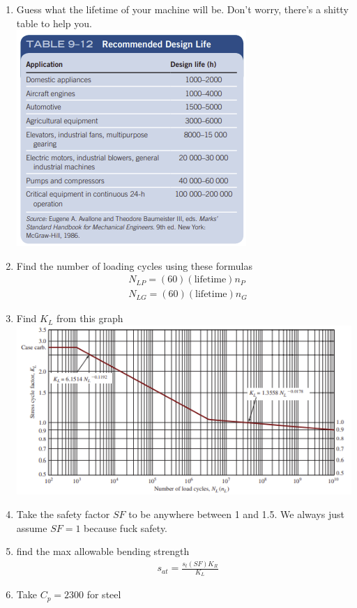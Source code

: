 \documentclass[11pt, fleqn]{article}
\begin{document}
\begin{enumerate}
    \item Guess what the lifetime of your machine will be. Don't worry, there's a shitty table to help you.\\
    \includegraphics[scale=1]{Gears/9-12.png}
    \item Find the number of loading cycles using these formulas
    \begin{align*}
        &N_{LP}=(60)(\text{lifetime})n_P\\
        &N_{LG}=(60)(\text{lifetime})n_G
    \end{align*}
    \item Find $K_L$ from this graph\\
    \includegraphics[scale=1]{Gears/Fig 10-16.png}
    \item Take the safety factor $SF$ to be anywhere between 1 and 1.5. We always just assume $SF=1$ because fuck safety.
    \item find the max allowable bending strength
    \begin{align*}
        &s_{at}=\frac{s_t(SF)K_R}{K_L}
    \end{align*}
    \item Take $C_p=2300$ for steel

\end{enumerate}
\end{document}
